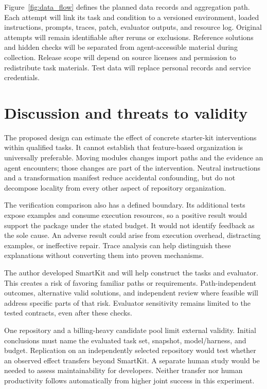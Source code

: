 \documentclass[11pt,a4paper]{article}
\begin{document}
Figure~\ref{fig:data_flow} defines the planned data records and aggregation path. Each attempt will link its task and condition to a versioned environment, loaded instructions, prompts, traces, patch, evaluator outputs, and resource log. Original attempts will remain identifiable after reruns or exclusions. Reference solutions and hidden checks will be separated from agent-accessible material during collection. Release scope will depend on source licenses and permission to redistribute task materials. Test data will replace personal records and service credentials.



\section{Discussion and threats to validity}
The proposed design can estimate the effect of concrete starter-kit interventions within qualified tasks. It cannot establish that feature-based organization is universally preferable. Moving modules changes import paths and the evidence an agent encounters; those changes are part of the intervention. Neutral instructions and a transformation manifest reduce accidental confounding, but do not decompose locality from every other aspect of repository organization.

The verification comparison also has a defined boundary. Its additional tests expose examples and consume execution resources, so a positive result would support the package under the stated budget. It would not identify feedback as the sole cause. An adverse result could arise from execution overhead, distracting examples, or ineffective repair. Trace analysis can help distinguish these explanations without converting them into proven mechanisms.

The author developed SmartKit and will help construct the tasks and evaluator. This creates a risk of favoring familiar paths or requirements. Path-independent outcomes, alternative valid solutions, and independent review where feasible will address specific parts of that risk. Evaluator sensitivity remains limited to the tested contracts, even after these checks.

One repository and a billing-heavy candidate pool limit external validity. Initial conclusions must name the evaluated task set, snapshot, model/harness, and budget. Replication on an independently selected repository would test whether an observed effect transfers beyond SmartKit. A separate human study would be needed to assess maintainability for developers. Neither transfer nor human productivity follows automatically from higher joint success in this experiment.
\end{document}
